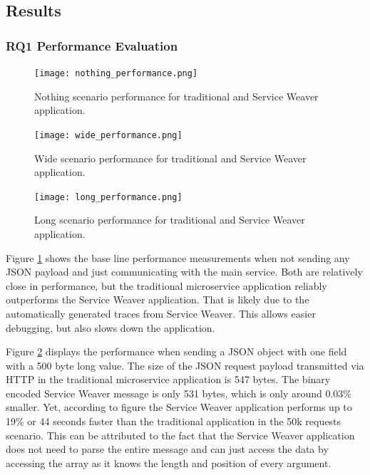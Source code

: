 \documentclass[sigconf,review,9pt]{acmart}
\begin{document}
\subsection{Results}

\subsubsection{RQ1 Performance Evaluation} \label{performance_section}

\begin{figure}
	\texttt{[image: nothing\_performance.png]}
	\caption{Nothing scenario performance for traditional and Service Weaver application.}
	\label{fig:nothing_performance}
\end{figure}

\begin{figure}
	\texttt{[image: wide\_performance.png]}
	\caption{Wide scenario performance for traditional and Service Weaver application.}
	\label{fig:wide_performance}
\end{figure}

\begin{figure}
	\texttt{[image: long\_performance.png]}
	\caption{Long scenario performance for traditional and Service Weaver application.}
	\label{fig:long_performance}
\end{figure}

Figure \ref{fig:nothing_performance} shows the base line performance measurements
when not sending any JSON payload and just communicating with the main service.
Both are relatively close in performance, but the traditional microservice application
reliably outperforms the Service Weaver application.
That is likely due to the automatically generated traces from Service Weaver.
This allows easier debugging, but also slows down the application.

Figure \ref{fig:wide_performance} displays the performance when sending a JSON object
with one field with a 500 byte long value.
The size of the JSON request payload transmitted via HTTP in the traditional microservice
application is 547 bytes.
The binary encoded Service Weaver message is only 531 bytes, which is only around
0.03\% smaller.
Yet, according to figure  the Service Weaver application
performs up to 19\% or 44 seconds faster than the traditional application in the 50k requests scenario.
This can be attributed to the fact that the Service Weaver application does not
need to parse the entire message and can just access the data by accessing the array
as it knows the length and position of every argument.
\end{document}
